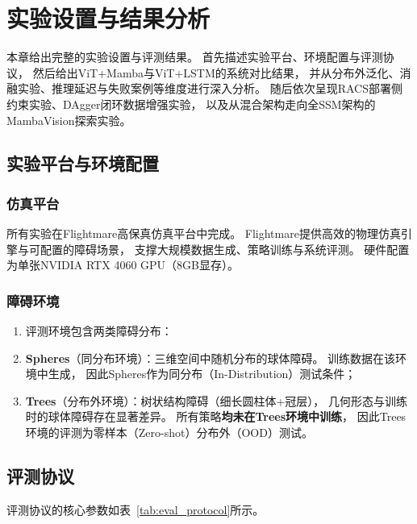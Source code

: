 \chapter{实验设置与结果分析}

本章给出完整的实验设置与评测结果。
首先描述实验平台、环境配置与评测协议，
然后给出ViT+Mamba与ViT+LSTM的系统对比结果，
并从分布外泛化、消融实验、推理延迟与失败案例等维度进行深入分析。
随后依次呈现RACS部署侧约束实验、DAgger闭环数据增强实验，
以及从混合架构走向全SSM架构的MambaVision探索实验。

\section{实验平台与环境配置}

\subsection{仿真平台}

所有实验在Flightmare高保真仿真平台\cite{Song2021Flightmare}中完成。
Flightmare提供高效的物理仿真引擎与可配置的障碍场景，
支撑大规模数据生成、策略训练与系统评测。
硬件配置为单张NVIDIA RTX 4060 GPU（8GB显存）。

\subsection{障碍环境}

\begin{enumerate}
\item 评测环境包含两类障碍分布：
\item \textbf{Spheres}（同分布环境）：三维空间中随机分布的球体障碍。
训练数据在该环境中生成，
因此Spheres作为同分布（In-Distribution）测试条件；
 \item \textbf{Trees}（分布外环境）：树状结构障碍（细长圆柱体+冠层），
几何形态与训练时的球体障碍存在显著差异。
所有策略\textbf{均未在Trees环境中训练}，
因此Trees环境的评测为零样本（Zero-shot）分布外（OOD）测试。
 \end{enumerate}


\section{评测协议}

评测协议的核心参数如表~\ref{tab:eval_protocol}所示。

